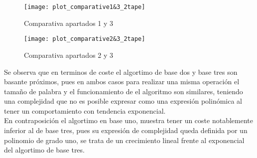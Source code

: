\begin{figure}[h]
    \centering
    \begin{minipage}[b]{0.45\linewidth}
    \centering
    \texttt{[image: plot\_comparative1\&3\_2tape]}
    \caption{ Comparativa apartados 1 y 3}
    \end{minipage}
    \hspace{0.5cm}
    \begin{minipage}[b]{0.45\linewidth}
    \centering
    \texttt{[image: plot\_comparative2\&3\_2tape]}
    \caption{ Comparativa apartados 2 y 3}
    \end{minipage}
\end{figure}

Se observa que en terminos de coste el algortimo de base dos y base tres son basante próximos, pues en ambos casos para realizar una misma operación el tamaño de palabra y el funcionamiento de el algoritmo son similares, teniendo una complejidad que no es posible expresar como una expresión polinómica al tener un comportamiento con tendencia exponencial.\\
En contraposición el algortimo en base uno, muestra tener un coste notablemente inferior al de base tres, pues su expresión de complejidad queda definida por un polinomio de grado uno, se trata de un crecimiento lineal frente al exponencial del algortimo de base tres.